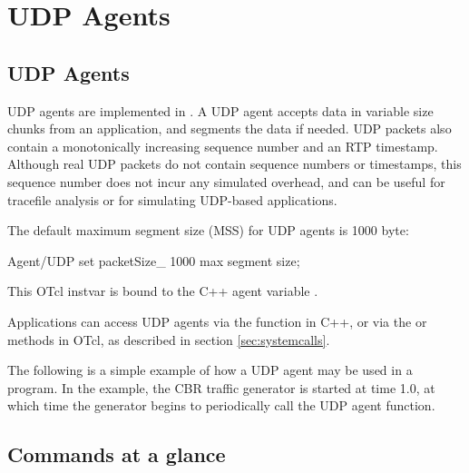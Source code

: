 \chapter{UDP Agents}
\label{sec:udpAgents}

\section{UDP Agents}
UDP agents are implemented in .  A UDP agent accepts
data in variable size chunks from an application, and segments the data 
if needed.  UDP packets also contain a monotonically increasing sequence
number and an RTP timestamp.  Although real UDP packets do not contain 
sequence numbers or timestamps, this sequence number does not incur any 
simulated overhead, and can be useful for tracefile analysis or for
simulating UDP-based applications.

The default maximum segment size (MSS) for UDP agents is 1000 byte:
\begin{program}
Agent/UDP set packetSize_   1000              \; max segment size;
\end{program}
This OTcl instvar is bound to the C++ agent variable .  

Applications can access UDP agents via the  function in C++,
or via the  or  methods in OTcl, as described in
section \ref{sec:systemcalls}.  

The following is a simple example of how a UDP agent may be used in a program.  
In the example, the CBR traffic generator is started at time 1.0, at which time
the generator begins to periodically call the UDP agent 
function.

\section{Commands at a glance}
\label{sec:udpcommand}

